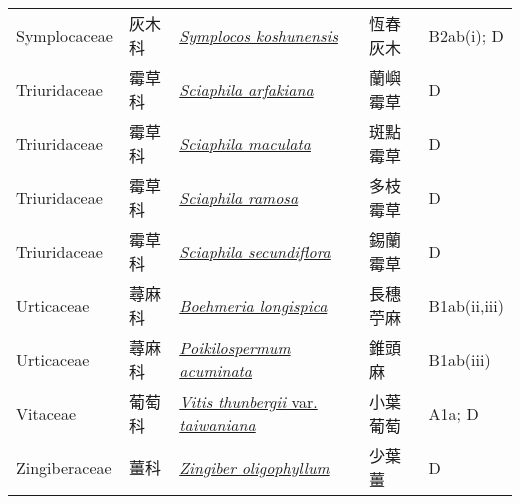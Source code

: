 {\begin{longtable}{p{2.5cm}p{2.5cm}p{4.5cm}p{2.5cm}p{3cm}}
    Symplocaceae & 灰木科 & \href{http://www.theplantlist.org/tpl1.1/search?q=Symplocos+koshunensis}{\textit{Symplocos koshunensis} } & 恆春灰木 & B2ab(i); D \index{Symplocos@\textit{Symplocos}!koshunensis@\textit{koshunensis}}  \index{恆春灰木} \\
    Triuridaceae & 霉草科 & \href{http://www.theplantlist.org/tpl1.1/search?q=Sciaphila+arfakiana}{\textit{Sciaphila arfakiana} } & 蘭嶼霉草 & D \index{Sciaphila@\textit{Sciaphila}!arfakiana@\textit{arfakiana}}  \index{蘭嶼霉草} \\
    Triuridaceae & 霉草科 & \href{http://www.theplantlist.org/tpl1.1/search?q=Sciaphila+maculata}{\textit{Sciaphila maculata} } & 斑點霉草 & D \index{Sciaphila@\textit{Sciaphila}!maculata@\textit{maculata}}  \index{斑點霉草} \\
    Triuridaceae & 霉草科 & \href{http://www.theplantlist.org/tpl1.1/search?q=Sciaphila+ramosa}{\textit{Sciaphila ramosa} } & 多枝霉草 & D \index{Sciaphila@\textit{Sciaphila}!ramosa@\textit{ramosa}}  \index{多枝霉草} \\
    Triuridaceae & 霉草科 & \href{http://www.theplantlist.org/tpl1.1/search?q=Sciaphila+secundiflora}{\textit{Sciaphila secundiflora} } & 錫蘭霉草 & D \index{Sciaphila@\textit{Sciaphila}!secundiflora@\textit{secundiflora}}  \index{錫蘭霉草} \\
    Urticaceae & 蕁麻科 & \href{http://www.theplantlist.org/tpl1.1/search?q=Boehmeria+longispica}{\textit{Boehmeria longispica} } & 長穗苧麻 & B1ab(ii,iii) \index{Boehmeria@\textit{Boehmeria}!longispica@\textit{longispica}}  \index{長穗苧麻} \\
    Urticaceae & 蕁麻科 & \href{http://www.theplantlist.org/tpl1.1/search?q=Poikilospermum+acuminata}{\textit{Poikilospermum acuminata} } & 錐頭麻 & B1ab(iii) \index{Poikilospermum@\textit{Poikilospermum}!acuminata@\textit{acuminata}}  \index{錐頭麻} \\
    Vitaceae & 葡萄科 & \href{http://www.theplantlist.org/tpl1.1/search?q=Vitis+thunbergii+var.+taiwaniana}{\textit{Vitis thunbergii} var. \textit{taiwaniana} } & 小葉葡萄 & A1a; D \index{Vitis@\textit{Vitis}!thunbergii@\textit{thunbergii}!var. taiwaniana@var. \textit{taiwaniana}}  \index{小葉葡萄} \\
    Zingiberaceae & 薑科 & \href{http://www.theplantlist.org/tpl1.1/search?q=Zingiber+oligophyllum}{\textit{Zingiber oligophyllum} } & 少葉薑 & D \index{Zingiber@\textit{Zingiber}!oligophyllum@\textit{oligophyllum}}  \index{少葉薑} \\
    \bottomrule
        \end{longtable}
        }
    